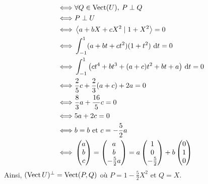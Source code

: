 \begin{exo}
\begin{enumerate}
\begin{align*}
				\iff& \forall Q \in \operatorname{Vect}(U),\: P \perp Q\\
				\iff& P \perp U\\
				\iff& \left<a + bX + cX^2  \mid 1 + X^2 \right> = 0\\
				\iff& \int_{-1}^1 (a+bt + ct^2)(1+t^2)~\mathrm{d}t = 0\\
				\iff& \int_{-1}^1 \big(ct^4 + bt^3 + (a+c)t^2 + bt + a\big)~\mathrm{d}t = 0\\
				\iff& \frac{2}{5} c + \frac{2}{3}(a+c) + 2a = 0\\
				\iff& \frac{8}{3} a + \frac{16}{5} c = 0\\
				\iff& 5a + 2c = 0\\
				\iff& b = b \text{ et } c = -\frac{5}{2} a\\
				\iff& \begin{pmatrix}
					a\\ b\\ c
				\end{pmatrix} = \begin{pmatrix}
					a\\ b\\ -\frac{5}{2}a
				\end{pmatrix} = a \begin{pmatrix}
					1\\ 0\\ -\frac{5}{2}
				\end{pmatrix} + b \begin{pmatrix}
					0\\ 1 \\ 0
				\end{pmatrix}
			\end{align*}
			Ainsi, $(\operatorname{Vect} U)^\perp = \operatorname{Vect}(P,Q)$\/ où $P = 1 - \frac{5}{2}X^2$\/ et $Q = X$.
	\end{enumerate}
\end{exo}
